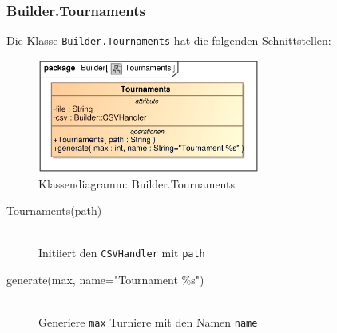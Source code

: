\subsubsection{Builder.Tournaments}
Die Klasse \verb|Builder.Tournaments| hat die folgenden Schnittstellen:
\begin{figure}[H]
    \myfloatalign
    \includegraphics[width=0.65\textwidth]{gfx/MtGDeepAnalysis/Tournaments.eps}
    \caption{Klassendiagramm: Builder.Tournaments}
    \label{fig:class:builder.Tournaments}
\end{figure}
\begin{description}
    \item[Tournaments(path)] \hfill \\
      Initiiert den \verb|CSVHandler| mit \verb|path|
     
    \item[generate(max, name="Tournament \%s")] \hfill \\
    Generiere \verb|max| Turniere mit den Namen \verb|name|
\end{description}

